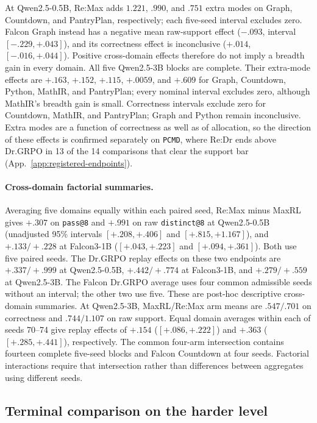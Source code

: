 \documentclass{article}
\newcommand{\1}{\mathbf 1}
\newcommand{\pmd}{\texttt{PCMD}}
\theoremstyle{remark}
\theoremstyle{definition}
\theoremstyle{plain}
\begin{document}
At Qwen2.5-0.5B, Re:Max adds $1.221$, $.990$, and $.751$ extra modes
on Graph, Countdown, and PantryPlan, respectively; each five-seed interval
excludes zero. Falcon Graph instead has a negative mean raw-support effect
($-.093$, interval $[-.229,+.043]$), and its correctness effect is inconclusive
($+.014$, $[-.016,+.044]$). Positive cross-domain effects therefore do not
imply a breadth gain in every domain. All five Qwen2.5-3B blocks are complete. Their extra-mode effects are
$+.163$, $+.152$, $+.115$, $+.0059$, and $+.609$ for Graph, Countdown,
Python, MathIR, and PantryPlan; every nominal interval excludes zero,
although MathIR's breadth gain is small. Correctness intervals exclude zero
for Countdown, MathIR, and PantryPlan; Graph and Python remain inconclusive.
Extra modes are a function of correctness as well as of allocation, so the
direction of these effects is confirmed separately on \pmd{}, where
Re:Dr ends above Dr.GRPO in 13 of the 14 comparisons that clear the
support bar (App.~\ref{app:registered-endpoints}).

\paragraph{Cross-domain factorial summaries.}
\label{app:factorial-numerical-detail}
Averaging five domains equally within each paired seed, Re:Max minus
MaxRL gives $+.307$ on \texttt{pass@8} and $+.991$ on raw
\texttt{distinct@8} at Qwen2.5-0.5B (unadjusted 95\% intervals
$[+.208,+.406]$ and $[+.815,+1.167]$), and $+.133/+.228$ at Falcon3-1B
($[+.043,+.223]$ and $[+.094,+.361]$). Both use five paired seeds.
The Dr.GRPO replay effects on these two endpoints are $+.337/+.999$ at
Qwen2.5-0.5B, $+.442/+.774$ at Falcon3-1B, and $+.279/+.559$ at
Qwen2.5-3B. The Falcon Dr.GRPO average uses four common admissible seeds
without an interval; the other two use five. These are post-hoc descriptive
cross-domain summaries. At Qwen2.5-3B, MaxRL/Re:Max arm means are
$.547/.701$ on correctness and $.744/1.107$ on raw support. Equal domain
averages within each of seeds 70--74 give replay effects of $+.154$
($[+.086,+.222]$) and $+.363$ ($[+.285,+.441]$), respectively.
The common four-arm intersection contains fourteen complete five-seed
blocks and Falcon Countdown
at four seeds. Factorial interactions require that intersection rather than
differences between aggregates using different seeds.


\subsection{Terminal comparison on the harder level}
\label{app:level2-interim}
\end{document}

